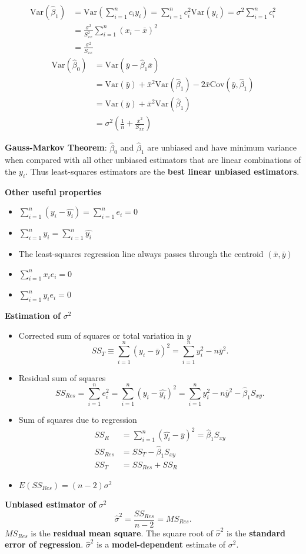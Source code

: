 \documentclass[frenchspacing,9pt,landscape,a4paper]{article}
\begin{document}
\begin{multicols}{3}
\begin{itemize}
\begin{align*}
			\text{Var}(\hat{\beta}_1)&=\text{Var}\left(\sum_{i=1}^n c_iy_i\right)=\sum_{i=1}^n c_i^2\text{Var}(y_i)=\sigma^2\sum_{i=1}^n c_i^2\\
									 &=\frac{\sigma^2}{S_{xx}^2}\sum_{i=1}^n(x_i-\bar{x})^2\\
									 &=\frac{\sigma^2}{S_{xx}}
		\end{align*}
		\begin{align*}
			\text{Var}(\hat{\beta}_0)&=\text{Var}(\bar{y}-\hat{\beta}_1\bar{x})\\
									 &=\text{Var}(\bar{y})+\bar{x}^2\text{Var}(\hat{\beta}_1)-2\bar{x}\text{Cov}(\bar{y},\hat{\beta}_1)\\
									 &=\text{Var}(\bar{y})+\bar{x}^2\text{Var}(\hat{\beta}_1)\\
									 &=\sigma^2\left(\frac{1}{n}+\frac{\bar{x}^2}{S_{xx}}\right)
		\end{align*}
\end{itemize}
\textbf{Gauss-Markov Theorem}: $\hat{\beta}_0$ and $\hat{\beta}_1$ are unbiased and have minimum variance when compared with all other unbiased estimators that are linear combinations of the $y_i$. Thus least-squares estimators are the \textbf{best linear unbiased estimators}.

\textbf{Other useful properties}
\begin{itemize}
	\item $\sum_{i=1}^n(y_i-\hat{y_i})=\sum_{i=1}^n e_i=0$
	\item  $\sum_{i=1}^n y_i=\sum_{i=1}^n\hat{y_i}$
	\item The least-squares regression line always passes through the centroid $(\bar{x},\bar{y})$
	\item  $\sum_{i=1}^n x_ie_i=0$
	\item  $\sum_{i=1}^n\hat{y_i}e_i=0$
\end{itemize}
\textbf{Estimation of} $\sigma^2$
\begin{itemize}
	\item Corrected sum of squares or total variation in $y$
		 \[
			 SS_T\equiv\sum_{i=1}^n(y_i-\bar{y})^2=\sum_{i=1}^n y_i^2-n\bar{y}^2
		.\]
	\item Residual sum of squares
		\[
			SS_{Res}=\sum_{i=1}^n e_i^2=\sum_{i=1}^n(y_i-\hat{y_i})^2=\sum_{i=1}^n y_i^2-n\bar{y}^2-\hat{\beta}_1S_{xy}
		.\]
	\item Sum of squares due to regression
		\begin{align*}
			SS_R&=\sum_{i=1}^n(\hat{y_i}-\bar{y})^2=\hat{\beta}_1S_{xy}\\
			SS_{Res}&=SS_T-\hat{\beta}_1S_{xy}\\
			SS_T&=SS_{Res}+SS_R
		\end{align*}
	\item $E(SS_{Res})=(n-2)\sigma^2$
\end{itemize}
\textbf{Unbiased estimator of} $\sigma^2$
\[\hat{\sigma}^2=\frac{SS_{Res}}{n-2}=MS_{Res}
.\] 
$MS_{Res}$ is the \textbf{residual mean square}. The square root of  $\hat{\sigma}^2$ is the \textbf{standard error of regression}.  $\hat{\sigma}^2$ is a \textbf{model-dependent} estimate of  $\sigma^2$.


\end{multicols}
\end{document}
